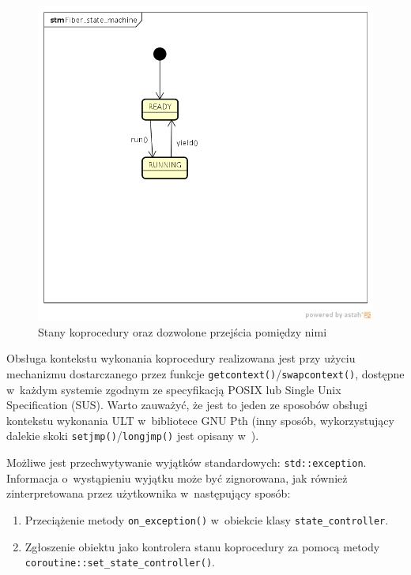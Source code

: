 \documentclass[11pt,makeidx]{mwart}
\newcommand{\code}{\texttt}
\newcommand{\dcolon}{::}
\newcommand{\procbr}{()}
\begin{document}
	\begin{figure}[h!]
		\centering
		\includegraphics[scale=.7]{LibcoroStates.png}
		\caption{Stany koprocedury oraz dozwolone przejścia pomiędzy nimi}
	\end{figure}
\par
%
\indent
	Obsługa kontekstu wykonania koprocedury realizowana jest przy użyciu mechanizmu dostarczanego przez funkcje
	\code{getcontext()}/\code{swapcontext()}, dostępne w~każdym systemie zgodnym ze specyfikacją POSIX lub Single Unix Specification (SUS).
	Warto zauważyć, że jest to jeden ze sposobów obsługi kontekstu wykonania
	ULT w~bibliotece GNU Pth (inny sposób, wykorzystujący dalekie skoki \code{setjmp\procbr}/\code{longjmp\procbr} jest opisany w~\cite{Engelschall}).
\par
%
\indent
	Możliwe jest przechwytywanie wyjątków standardowych: \code{std\dcolon exception}. Informacja o~wystąpieniu wyjątku może być zignorowana,
	jak również zinterpretowana przez użytkownika w~następujący sposób:
	\begin{enumerate}
		\item Przeciążenie metody \code{on\_exception\procbr} w~obiekcie klasy \code{state\_controller}.
		\item Zgłoszenie obiektu jako kontrolera stanu koprocedury za pomocą metody \code{coroutine\dcolon set\_state\_controller\procbr}.
	\end{enumerate}
\end{document}
